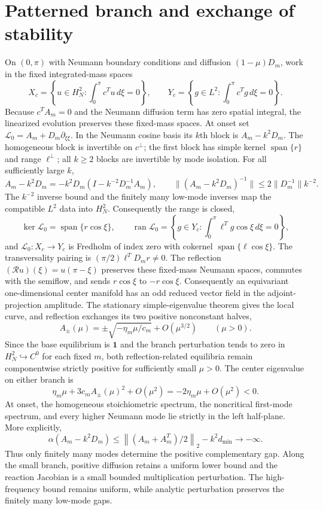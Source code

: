 \section*{Patterned branch and exchange of stability}
On $(0,\pi)$ with Neumann boundary conditions and diffusion
$(1-\mu)D_m$, work in the fixed integrated-mass spaces
\[
X_c=\left\{u\in H_N^2:\int_0^\pi c^Tu\,d\xi=0\right\},
\qquad
Y_c=\left\{g\in L^2:\int_0^\pi c^Tg\,d\xi=0\right\}.
\]
Because $c^TA_m=0$ and the Neumann diffusion term has zero spatial integral,
the linearized evolution preserves these fixed-mass spaces.  At onset set
$\mathcal L_0=A_m+D_m\partial_{\xi\xi}$.  In the Neumann cosine basis its
$k$th block is $A_m-k^2D_m$.  The homogeneous block is invertible on
$c^\perp$; the first block has simple kernel $\operatorname{span}\{r\}$ and
range $\ell^\perp$; all $k\ge2$ blocks are invertible by mode isolation.  For
all sufficiently large $k$,
\[
A_m-k^2D_m=-k^2D_m(I-k^{-2}D_m^{-1}A_m),\qquad
\|(A_m-k^2D_m)^{-1}\|\le2\|D_m^{-1}\|k^{-2}.
\]
The $k^{-2}$ inverse bound and the finitely many low-mode inverses map the
compatible $L^2$ data into $H_N^2$.  Consequently the range is closed,
\[
\ker\mathcal L_0=\operatorname{span}\{r\cos\xi\},\qquad
\operatorname{ran}\mathcal L_0
=\left\{g\in Y_c:\int_0^\pi\ell^Tg\cos\xi\,d\xi=0\right\},
\]
and $\mathcal L_0:X_c\to Y_c$ is Fredholm of index zero with cokernel
$\operatorname{span}\{\ell\cos\xi\}$.  The transversality pairing is
$(\pi/2)\ell^TD_mr\ne0$.  The reflection
$(\mathcal Ru)(\xi)=u(\pi-\xi)$ preserves these fixed-mass Neumann spaces,
commutes with the semiflow, and sends $r\cos\xi$ to $-r\cos\xi$.
Consequently an equivariant one-dimensional center manifold has an odd
reduced vector field in the adjoint-projection amplitude.  The stationary
simple-eigenvalue theorem gives the local curve, and reflection exchanges its
two positive nonconstant halves,
\[
A_\pm(\mu)=\pm\sqrt{-\eta_m\mu/c_m}+O(\mu^{3/2})
\qquad(\mu>0).
\]
Since the base equilibrium is $\mathbf1$ and the branch perturbation tends to
zero in $H_N^2\hookrightarrow C^0$ for each fixed $m$, both
reflection-related equilibria remain componentwise strictly positive for
sufficiently small $\mu>0$.
The center eigenvalue on either branch is
\[
\eta_m\mu+3c_mA_\pm(\mu)^2+O(\mu^2)
=-2\eta_m\mu+O(\mu^2)<0.
\]
At onset, the homogeneous stoichiometric spectrum, the noncritical first-mode
spectrum, and every higher Neumann mode lie strictly in the left half-plane.
More explicitly,
\[
\alpha(A_m-k^2D_m)
\le\left\|(A_m+A_m^T)/2\right\|_2-k^2d_{\min}\longrightarrow-\infty.
\]
Thus only finitely many modes determine the positive complementary gap.
Along the small branch, positive diffusion retains a uniform lower bound and
the reaction Jacobian is a small bounded multiplication perturbation.  The
high-frequency bound remains uniform, while analytic perturbation preserves
the finitely many low-mode gaps.

